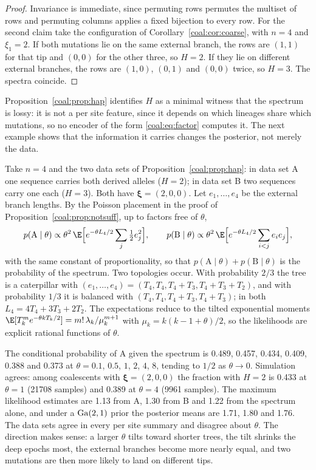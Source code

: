 \begin{proof}
Invariance is immediate, since permuting rows permutes the multiset of rows and permuting columns applies a fixed bijection to every row. For the second claim take the configuration of Corollary~\ref{coal:cor:coarse}, with $n=4$ and $\xi_1=2$. If both mutations lie on the same external branch, the rows are $(1,1)$ for that tip and $(0,0)$ for the other three, so $H=2$. If they lie on different external branches, the rows are $(1,0)$, $(0,1)$ and $(0,0)$ twice, so $H=3$. The spectra coincide.
\end{proof}

Proposition~\ref{coal:prop:hap} identifies $H$ as a minimal witness that the spectrum is lossy: it is not a per site feature, since it depends on which lineages share which mutations, so no encoder of the form \eqref{coal:eq:factor} computes it. The next example shows that the information it carries changes the posterior, not merely the data.

\begin{example}\label{coal:ex:samesfs}
Take $n=4$ and the two data sets of Proposition~\ref{coal:prop:hap}: in data set A one sequence carries both derived alleles ($H=2$); in data set B two sequences carry one each ($H=3$). Both have $\bm\xi=(2,0,0)$. Let $e_1,\dots,e_4$ be the external branch lengths. By the Poisson placement in the proof of Proposition~\ref{coal:prop:notsuff}, up to factors free of $\theta$,
\[
p(\mathrm A\mid\theta)\propto\theta^2\,\E\Bigl[e^{-\theta L_4/2}\sum_j\tfrac12e_j^2\Bigr],\qquad
p(\mathrm B\mid\theta)\propto\theta^2\,\E\Bigl[e^{-\theta L_4/2}\sum_{i<j}e_ie_j\Bigr],
\]
with the same constant of proportionality, so that $p(\mathrm A\mid\theta)+p(\mathrm B\mid\theta)$ is the probability of the spectrum. Two topologies occur. With probability $2/3$ the tree is a caterpillar with $(e_1,\dots,e_4)=(T_4,T_4,T_4+T_3,T_4+T_3+T_2)$, and with probability $1/3$ it is balanced with $(T_4,T_4,T_4+T_3,T_4+T_3)$; in both $L_4=4T_4+3T_3+2T_2$. The expectations reduce to the tilted exponential moments $\E[T_k^me^{-\theta kT_k/2}]=m!\,\lambda_k/\mu_k^{m+1}$ with $\mu_k=k(k-1+\theta)/2$, so the likelihoods are explicit rational functions of $\theta$.

The conditional probability of A given the spectrum is 0.489, 0.457, 0.434, 0.409, 0.388 and 0.373 at $\theta=0.1$, $0.5$, $1$, $2$, $4$, $8$, tending to $1/2$ as $\theta\to0$. Simulation agrees: among coalescents with $\bm\xi=(2,0,0)$ the fraction with $H=2$ is 0.433 at $\theta=1$ (21708 samples) and 0.389 at $\theta=4$ (9961 samples). The maximum likelihood estimates are 1.13 from A, 1.30 from B and 1.22 from the spectrum alone, and under a $\mathrm{Ga}(2,1)$ prior the posterior means are 1.71, 1.80 and 1.76. The data sets agree in every per site summary and disagree about $\theta$. The direction makes sense: a larger $\theta$ tilts toward shorter trees, the tilt shrinks the deep epochs most, the external branches become more nearly equal, and two mutations are then more likely to land on different tips.
\end{example}

